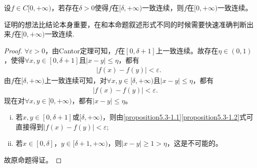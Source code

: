 \documentclass[../../main.tex]{subfiles}%
\begin{document}
\begin{proposition}[一致连续函数的拼接]\label{proposition:一致连续函数的拼接}
设\(f\in C[0,+\infty)\)，若存在\(\delta>0\)使得\(f\)在\([\delta,+\infty)\)一致连续，则\(f\)在\([0,+\infty)\)一致连续。
\end{proposition}
\begin{note}
证明的想法比结论本身重要，在和本命题叙述形式不同的时候需要快速准确判断出来\(f\)在\([0,+\infty)\)一致连续.
\end{note}
\begin{proof}
\(\forall \varepsilon >0\)，由Cantor定理可知，\(f\)在\([0,\delta + 1]\)上一致连续。故存在\(\eta \in (0,1)\)，使得\(\forall x,y\in [0,\delta + 1]\)且\(\vert x - y\vert\leqslant \eta\)，都有
\begin{align}
\vert f(x) - f(y)\vert<\varepsilon.\label{proposition5.3-1.1}
\end{align}
由\(f\)在\([\delta, +\infty)\)上一致连续可知，对\(\forall x,y\in [\delta, +\infty)\)且\(\vert x - y\vert\leqslant \eta\)，都有
\begin{align}
\vert f(x) - f(y)\vert<\varepsilon. \quad \label{proposition5.3-1.2} 
\end{align}
现在对\(\forall x,y\in [0, +\infty)\)，都有\(\vert x - y\vert\leqslant \eta\)。
\begin{enumerate}[(i)]
\item 若\(x,y\in [0,\delta + 1]\)或\([\delta, +\infty)\)，则由\eqref{proposition5.3-1.1}\eqref{proposition5.3-1.2}式可直接得到\(\vert f(x) - f(y)\vert<\varepsilon\);

\item 若\(x\in [0,\delta]\)，\(y\in [\delta+1, +\infty)\)，则\(\vert x - y\vert\geqslant 1>\eta\)，这是不可能的。
\end{enumerate}
故原命题得证。
\end{proof}
\end{document}
